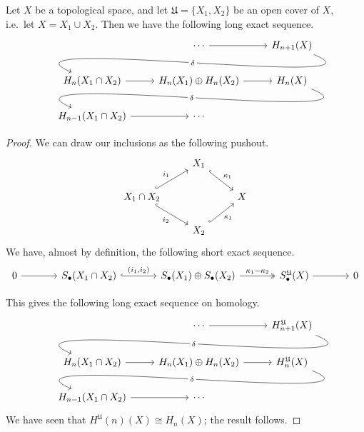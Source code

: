 \documentclass[main.tex]{subfiles}
\begin{document}
\begin{theorem}
  \label{thm:mayer_vietoris}
  Let $X$ be a topological space, and let $\mathfrak{U} = \{X_{1}, X_{2}\}$ be an open cover of $X$, i.e.\ let $X = X_{1} \cup X_{2}$. Then we have the following long exact sequence.
  \begin{equation*}
    \begin{tikzcd}
      & \cdots
      \arrow[r]
      & H_{n+1}(X)
      \\
      H_{n}(X_{1} \cap X_{2})
      \arrow[from=urr, out=-22, in=157, looseness=1, overlay, "\delta" description]
      \arrow[r]
      & H_{n}(X_{1}) \oplus H_{n}(X_{2})
      \arrow[r]
      & H_{n}(X)
      \\
      H_{n-1}(X_{1} \cap X_{2})
      \arrow[r]
      \arrow[from=urr, out=-22, in=157, looseness=1, overlay, "\delta" description]
      & \cdots
    \end{tikzcd}
  \end{equation*}
\end{theorem}
\begin{proof}
  We can draw our inclusions as the following pushout.
  \begin{equation*}
    \begin{tikzcd}
      & X_{1}
      \arrow[dr, hook, "\kappa_{1}"]
      \\
      X_{1} \cap X_{2}
      \arrow[ur, hook, "i_{1}"]
      \arrow[dr, hook, swap, "i_{2}"]
      && X
      \\
      & X_{2}
      \arrow[ur, hook, swap, "\kappa_{1}"]
    \end{tikzcd}
  \end{equation*}
  We have, almost by definition, the following short exact sequence.
  \begin{equation*}
    \begin{tikzcd}[column sep=large]
      0
      \arrow[r]
      & S_{\bullet}(X_{1} \cap X_{2})
      \arrow[r, hook, "{(i_{1} , i_{2})}"]
      & S_{\bullet}(X_{1}) \oplus S_{\bullet}(X_{2})
      \arrow[r, two heads, "\kappa_{1} - \kappa_{2}"]
      & S^{\mathfrak{U}}_{\bullet}(X)
      \arrow[r]
      & 0
    \end{tikzcd}
  \end{equation*}

  This gives the following long exact sequence on homology.
  \begin{equation*}
    \begin{tikzcd}
      & \cdots
      \arrow[r]
      & H_{n+1}^{\mathfrak{U}}(X)
      \\
      H_{n}(X_{1} \cap X_{2})
      \arrow[from=urr, out=-22, in=157, looseness=1, overlay, "\delta" description]
      \arrow[r]
      & H_{n}(X_{1}) \oplus H_{n}(X_{2})
      \arrow[r]
      & H_{n}^{\mathfrak{U}}(X)
      \\
      H_{n-1}(X_{1} \cap X_{2})
      \arrow[r]
      \arrow[from=urr, out=-22, in=157, looseness=1, overlay, "\delta" description]
      & \cdots
    \end{tikzcd}
  \end{equation*}
  We have seen that $H^{\mathfrak{U}}(n)(X) \cong H_{n}(X)$; the result follows.
\end{proof}
\end{document}
